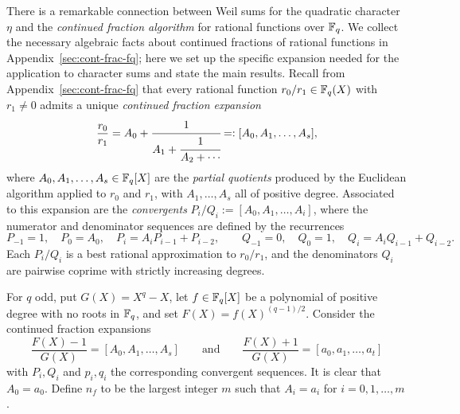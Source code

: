 There is a remarkable connection between Weil sums for the quadratic character $\eta$ and the \emph{continued fraction algorithm} for rational functions over $\mathbb{F}_q$. We collect the necessary algebraic facts about continued fractions of rational functions in Appendix~\ref{sec:cont-frac-fq}; here we set up the specific expansion needed for the application to character sums and state the main results.
Recall from Appendix~\ref{sec:cont-frac-fq} that every rational function $r_0/r_1\in\mathbb{F}_q(X)$ with $r_1\neq 0$ admits a unique \emph{continued fraction expansion}
$$\frac{r_0}{r_1} = A_0 + \cfrac{1}{A_1+\cfrac{1}{A_2+\cdots}} =: [A_0,A_1,\dots,A_s],$$
where $A_0,A_1,\dots,A_s\in\mathbb{F}_q[X]$ are the \emph{partial quotients} produced by the Euclidean algorithm applied to $r_0$ and $r_1$, with $A_1,\dots,A_s$ all of positive degree. Associated to this expansion are the \emph{convergents} $P_i/Q_i := [A_0,A_1,\dots,A_i]$, where the numerator and denominator sequences are defined by the recurrences
$$P_{-1}=1,\quad P_0=A_0,\quad P_i = A_i P_{i-1}+P_{i-2}, \qquad Q_{-1}=0,\quad Q_0=1,\quad Q_i = A_i Q_{i-1}+Q_{i-2}.$$
Each $P_i/Q_i$ is a best rational approximation to $r_0/r_1$, and the denominators $Q_i$ are pairwise coprime with strictly increasing degrees.

For $q$ odd, put $G(X)=X^q-X$, let $f\in\mathbb{F}_q[X]$ be a polynomial of positive degree with no roots in $\mathbb{F}_q$, and set $F(X)=f(X)^{(q-1)/2}$. Consider the continued fraction expansions
$$\frac{F(X)-1}{G(X)}=[A_0,A_1,\dots,A_s]\qquad\text{and}\qquad\frac{F(X)+1}{G(X)}=[a_0,a_1,\dots,a_t]$$
with $P_i,Q_i$ and $p_i,q_i$ the corresponding convergent sequences. It is clear that $A_0=a_0$. Define $n_f$ to be the largest integer $m$ such that $A_i=a_i$ for $i=0,1,\dots,m$.

